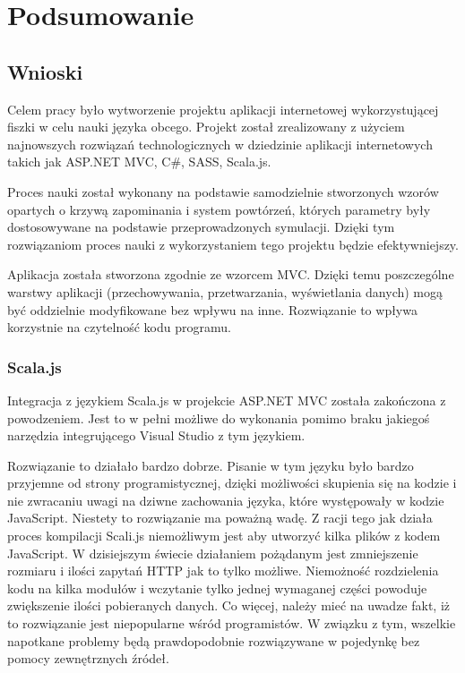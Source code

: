 \newpage
{\let\cleardoublepage\relax \chapter{Podsumowanie}}
\label{cha:summary}

\section{Wnioski}

Celem pracy było wytworzenie projektu aplikacji internetowej wykorzystującej fiszki w celu nauki języka obcego. Projekt został zrealizowany z użyciem najnowszych rozwiązań technologicznych w dziedzinie aplikacji internetowych takich jak ASP.NET MVC, C\#, SASS, Scala.js.

Proces nauki został wykonany na podstawie samodzielnie stworzonych wzorów opartych o krzywą zapominania i system powtórzeń, których parametry były dostosowywane na podstawie przeprowadzonych symulacji. Dzięki tym rozwiązaniom proces nauki z wykorzystaniem tego projektu będzie efektywniejszy.

Aplikacja została stworzona zgodnie ze wzorcem MVC. Dzięki temu poszczególne warstwy aplikacji (przechowywania, przetwarzania, wyświetlania danych) mogą być oddzielnie modyfikowane bez wpływu na inne. Rozwiązanie to wpływa korzystnie na czytelność kodu programu.

\subsection{Scala.js}

Integracja z językiem Scala.js w projekcie ASP.NET MVC została zakończona z powodzeniem. Jest to w pełni możliwe do wykonania pomimo braku jakiegoś narzędzia integrującego Visual Studio z tym językiem. 

Rozwiązanie to działało bardzo dobrze. Pisanie w tym języku było bardzo przyjemne od strony programistycznej, dzięki możliwości skupienia się na kodzie i nie zwracaniu uwagi na dziwne zachowania języka, które występowały w kodzie JavaScript.
Niestety to rozwiązanie ma poważną wadę. Z racji tego jak działa proces kompilacji Scali.js niemożliwym jest aby utworzyć kilka plików z kodem JavaScript. W dzisiejszym świecie działaniem pożądanym jest zmniejszenie rozmiaru i ilości zapytań HTTP jak to tylko możliwe. Niemożność rozdzielenia kodu na kilka modułów i wczytanie tylko jednej wymaganej części powoduje zwiększenie ilości pobieranych danych.
Co więcej, należy mieć na uwadze fakt, iż to rozwiązanie jest niepopularne wśród programistów. W związku z tym, wszelkie napotkane problemy będą prawdopodobnie rozwiązywane w pojedynkę bez pomocy zewnętrznych źródeł.

